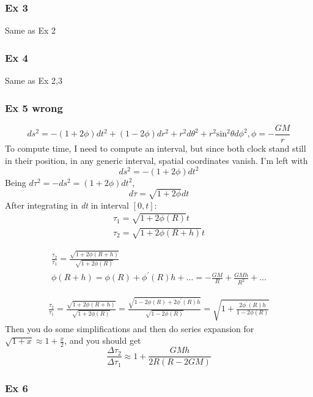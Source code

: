 \subsubsection{Ex 3}
Same as Ex 2
\subsubsection{Ex 4}
Same as Ex 2,3
\subsubsection{Ex 5 wrong}
\[
ds^{2} = -\left( 1+2\phi  \right)dt^{2} +\left( 1-2\phi  \right)dr^{2}+r^{2}d\theta ^{2}+r^{2}\text{sin}^{2}\theta d\phi ^{2}, \phi = - \frac{GM}{r}	
\]
To compute time, I need to compute an interval, but since both clock stand still in their position, in any generic interval, spatial coordinates vanish. I'm left with
\[
ds^{2} = -\left( 1+2\phi  \right)dt^{2}
\]
Being $d\tau ^{2} =- ds^{2} = \left( 1+2\phi  \right)dt^{2}$,
\[
	d\tau  = \sqrt{1+2\phi }dt
\]
After integrating in \emph{dt} in interval $\left[ 0,t \right]$:
\begin{gather*}
	\tau _{1} = \sqrt{1+2\phi \left( R \right)}t \\
	\tau _{2} = \sqrt{1+2\phi \left( R+h \right)}t
\end{gather*}

\begin{gather*}
	\frac{\tau _{2}}{\tau _{1}} = \frac{\sqrt{1+2\phi\left( R+h \right)}}{\sqrt{1+2\phi \left( R \right)}} \\
\phi \left( R+h \right) = \phi \left( R \right) +\phi ^{\prime }\left( R \right)h +\ldots = - \frac{GM}{R} + \frac{GMh}{R^{2}} +\ldots 	 
\end{gather*}

\begin{gather*}
\frac{\tau _{2}}{\tau _{1}} = \frac{\sqrt{1+2\phi \left( R+h \right)}}{\sqrt{1+2\phi \left( R \right)}} = \frac{\sqrt{1-2\phi \left( R \right) +2\phi^{\prime } \left( R \right)h }}{\sqrt{1-2\phi \left( R \right)}} = \sqrt{1 + \frac{ 2\phi^{\prime }\left( R \right)h}{1 -2\phi \left( R \right)}}
\end{gather*}
Then you do some simplifications and then do series expansion for $\sqrt{1+x} \approx 1 + \frac{x}{2}$, and you should get 
\[
\frac{\Delta \tau _{2}}{\Delta \tau _{1}} \approx 1 + \frac{GMh}{2R\left( R-2GM \right)}
\]

\subsubsection{Ex 6}

